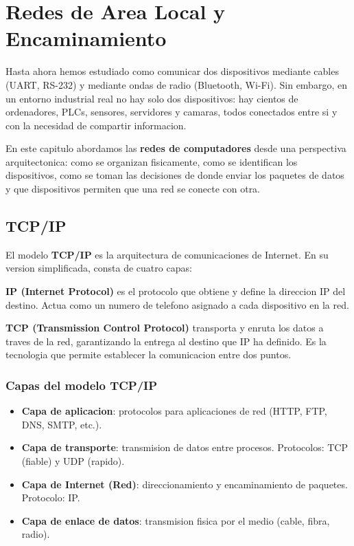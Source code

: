 
\chapter{Redes de Area Local y Encaminamiento}

Hasta ahora hemos estudiado como comunicar dos dispositivos mediante cables
(UART, RS-232) y mediante ondas de radio (Bluetooth, Wi-Fi). Sin embargo, en
un entorno industrial real no hay solo dos dispositivos: hay cientos de
ordenadores, PLCs, sensores, servidores y camaras, todos conectados entre si
y con la necesidad de compartir informacion.

En este capitulo abordamos las \textbf{redes de computadores} desde una
perspectiva arquitectonica: como se organizan fisicamente, como se identifican
los dispositivos, como se toman las decisiones de donde enviar los paquetes de
datos y que dispositivos permiten que una red se conecte con otra.


\section{TCP/IP}

El modelo \textbf{TCP/IP} es la arquitectura de comunicaciones de Internet. En su version simplificada, consta de cuatro capas:

\begin{definicion}
\textbf{IP (Internet Protocol)} es el protocolo que obtiene y define la direccion IP del destino. Actua como un numero de telefono asignado a cada dispositivo en la red.

\textbf{TCP (Transmission Control Protocol)} transporta y enruta los datos a traves de la red, garantizando la entrega al destino que IP ha definido. Es la tecnologia que permite establecer la comunicacion entre dos puntos.
\end{definicion}

\subsection{Capas del modelo TCP/IP}

\begin{itemize}
    \item \textbf{Capa de aplicacion}: protocolos para aplicaciones de red (HTTP, FTP, DNS, SMTP, etc.).
    \item \textbf{Capa de transporte}: transmision de datos entre procesos. Protocolos: TCP (fiable) y UDP (rapido).
    \item \textbf{Capa de Internet (Red)}: direccionamiento y encaminamiento de paquetes. Protocolo: IP.
    \item \textbf{Capa de enlace de datos}: transmision fisica por el medio (cable, fibra, radio).
\end{itemize}

